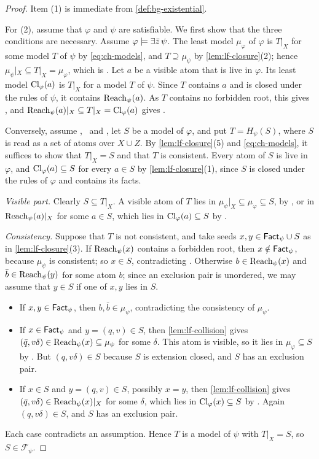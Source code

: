 \begin{proof}
Item (1) is immediate from \cref{def:bg-existential}.

For (2), assume that $\varphi$ and $\psi$ are satisfiable. We first show
that the three conditions are necessary. Assume $\varphi\models\exists\bar z\,\psi$.
The least model $\mu_\varphi$ of $\varphi$ is $T|_X$ for some model $T$ of
$\psi$ by \cref{eq:ch-models}, and $T\supseteq\mu_\psi$ by
\cref{lem:lf-closure}(2); hence $\mu_\psi|_X\subseteq T|_X=\mu_\varphi$,
which is \CondI. Let $a$ be a visible atom that is live in $\varphi$. Its
least model $\operatorname{Cl}_\varphi(a)$ is $T|_X$ for a model $T$ of $\psi$. Since $T$
contains $a$ and is closed under the rules of $\psi$, it contains $\operatorname{Reach}_\psi(a)$.
As $T$ contains no forbidden root, this gives \CondU, and
$\operatorname{Reach}_\psi(a)|_X\subseteq T|_X=\operatorname{Cl}_\varphi(a)$ gives \CondII.

Conversely, assume \CondI, \CondU\ and \CondII, let $S$ be a model of
$\varphi$, and put $T=H_\psi(S)$, where $S$ is read as a set of atoms over
$X\cup Z$. By \cref{lem:lf-closure}(5) and \cref{eq:ch-models}, it suffices
to show that $T|_X=S$ and that $T$ is consistent. Every atom of $S$ is live
in $\varphi$, and $\operatorname{Cl}_\varphi(a)\subseteq S$ for every $a\in S$ by
\cref{lem:lf-closure}(1), since $S$ is closed under the rules of $\varphi$ and
contains its facts.

\emph{Visible part.} Clearly $S\subseteq T|_X$. A visible atom of $T$ lies in
$\mu_\psi|_X\subseteq\mu_\varphi\subseteq S$, by \CondI, or in $\operatorname{Reach}_\psi(a)|_X$
for some $a\in S$, which lies in $\operatorname{Cl}_\varphi(a)\subseteq S$ by \CondII.

\emph{Consistency.} Suppose that $T$ is not consistent, and take seeds
$x,y\in\mathsf{Fact}_\psi\cup S$ as in \cref{lem:lf-closure}(3). If $\operatorname{Reach}_\psi(x)$
contains a forbidden root, then $x\notin\mathsf{Fact}_\psi$, because $\mu_\psi$ is
consistent; so $x\in S$, contradicting \CondU. Otherwise $b\in \operatorname{Reach}_\psi(x)$
and $\bar b\in \operatorname{Reach}_\psi(y)$ for some atom $b$; since an exclusion pair is
unordered, we may assume that $y\in S$ if one of $x,y$ lies in $S$.
\begin{itemize}[leftmargin=*]
\item If $x,y\in\mathsf{Fact}_\psi$, then $b,\bar b\in\mu_\psi$, contradicting the
  consistency of $\mu_\psi$.
\item If $x\in\mathsf{Fact}_\psi$ and $y=(q,v)\in S$, then \cref{lem:lf-collision}
  gives $(\bar q,v\delta)\in \operatorname{Reach}_\psi(x)\subseteq\mu_\psi$ for some $\delta$.
  This atom is visible, so it lies in $\mu_\varphi\subseteq S$ by \CondI. But
  $(q,v\delta)\in S$ because $S$ is extension closed, and $S$ has an
  exclusion pair.
\item If $x\in S$ and $y=(q,v)\in S$, possibly $x=y$, then
  \cref{lem:lf-collision} gives $(\bar q,v\delta)\in \operatorname{Reach}_\psi(x)|_X$ for some
  $\delta$, which lies in $\operatorname{Cl}_\varphi(x)\subseteq S$ by \CondII. Again
  $(q,v\delta)\in S$, and $S$ has an exclusion pair.
\end{itemize}
Each case contradicts an assumption. Hence $T$ is a model of $\psi$ with
$T|_X=S$, so $S\in\mathcal F_\psi$.
\end{proof}

